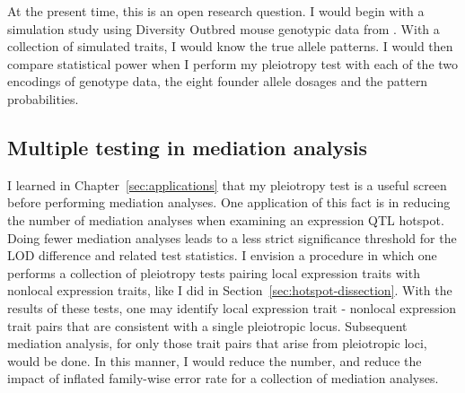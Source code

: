 At the present time, this is an open research question. I would begin with a simulation study using Diversity Outbred mouse genotypic data from \citep{keller2018genetic}. With a collection of simulated traits, I would know the true allele patterns. I would then compare statistical power when I perform my pleiotropy test with each of the two encodings of genotype data, the eight founder allele dosages and the pattern probabilities.








\subsection{Multiple testing in mediation analysis}

I learned in Chapter~\ref{sec:applications} that my pleiotropy test is a useful screen before performing mediation analyses. One application of this fact is in reducing the number of mediation analyses when examining an expression QTL hotspot. Doing fewer mediation analyses leads to a less strict significance threshold for the LOD difference and related test statistics. I envision a procedure in which one performs a collection of pleiotropy tests pairing local expression traits with nonlocal expression traits, like I did in Section~\ref{sec:hotspot-dissection}. With the results of these tests, one may identify local expression trait - nonlocal expression trait pairs that are consistent with a single pleiotropic locus. Subsequent mediation analysis, for only those trait pairs that arise from pleiotropic loci, would be done. In this manner, I would reduce the number, and reduce the impact of inflated family-wise error rate for a collection of mediation analyses.



